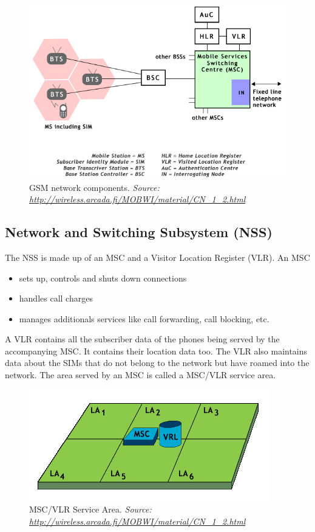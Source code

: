 \begin{figure}
\centering
\includegraphics[scale=0.7]{gsmNetworkComponents}
\caption[GSM network components]{GSM network components.
\emph{Source: \url{http://wireless.arcada.fi/MOBWI/material/CN\_1\_2.html}}}
\end{figure}




\subsection{Network and Switching Subsystem (NSS)}

The NSS is made up of an MSC and a Visitor Location Register (VLR). An MSC 
\begin{itemize} 
\item sets up, controls and shuts down connections
\item handles call charges
\item manages additionals services like call forwarding, call blocking, etc.
\end{itemize}

A VLR contains all the subscriber data of the phones being served by the accompanying MSC. It contains their location data too. The VLR also maintains data about the SIMs that do not belong to the network but have roamed into the network. The area served by an MSC is called a MSC/VLR service area.

\begin{figure}
\centering
\includegraphics[scale=0.7]{mscvlrServiceArea}
\caption[MSC/VLR Service Area]{MSC/VLR Service Area.
\emph{Source: \url{http://wireless.arcada.fi/MOBWI/material/CN\_1\_2.html}}}
\end{figure}

